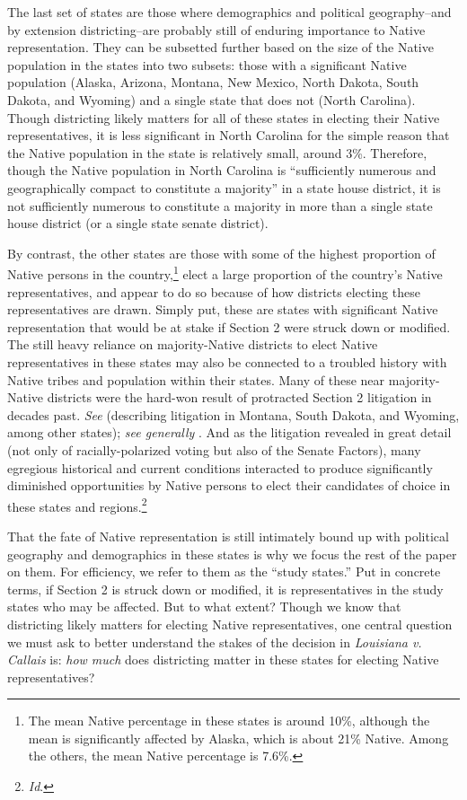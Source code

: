 \documentclass[12pt]{article}
\begin{document}
The last set of states are those where demographics and political geography–and by extension districting–are probably still of enduring importance to Native representation. They can be subsetted further based on the size of the Native population in the states into two subsets: those with a significant Native population (Alaska, Arizona, Montana, New Mexico, North Dakota, South Dakota, and Wyoming) and a single state that does not (North Carolina). Though districting likely matters for all of these states in electing their Native representatives, it is less significant in North Carolina for the simple reason that the Native population in the state is relatively small, around 3\%. Therefore, though the Native population in North Carolina is ``sufficiently numerous and geographically compact to constitute a majority'' in a state house district, it is not sufficiently numerous to constitute a majority in more than a single state house district (or a single state senate district).

By contrast, the other states are those with some of the highest proportion of Native persons in the country,\footnote{The mean Native percentage in these states is around 10\%, although the mean is significantly affected by Alaska, which is about 21\% Native. Among the others, the mean Native percentage is 7.6\%.} elect a large proportion of the country's Native representatives, and appear to do so because of how districts electing these representatives are drawn. Simply put, these are states with significant Native representation that would be at stake if Section 2 were struck down or modified. The still heavy reliance on majority-Native districts to elect Native representatives in these states may also be connected to a troubled history with Native tribes and population within their states. Many of these near majority-Native districts were the hard-won result of protracted Section 2 litigation in decades past. \textit{See} \cite{mcdonald2010american} (describing litigation in Montana, South Dakota, and Wyoming, among other states); \textit{see generally} \cite{mccool2007native}. And as the litigation revealed in great detail (not only of racially-polarized voting but also of the Senate Factors), many egregious historical and current conditions interacted to produce significantly diminished opportunities by Native persons to elect their candidates of choice in these states and regions.\footnote{\textit{Id}.}

That the fate of Native representation is still intimately bound up with political geography and demographics in these states is why we focus the rest of the paper on them. For efficiency, we refer to them as the ``study states.'' Put in concrete terms, if Section 2 is struck down or modified, it is representatives in the study states who may be affected. But to what extent?  Though we know that districting likely matters for electing Native representatives, one central question we must ask to better understand the stakes of the decision in \textit{Louisiana v. Callais} is: \textit{how much} does districting matter in these states for electing Native representatives?
\end{document}
